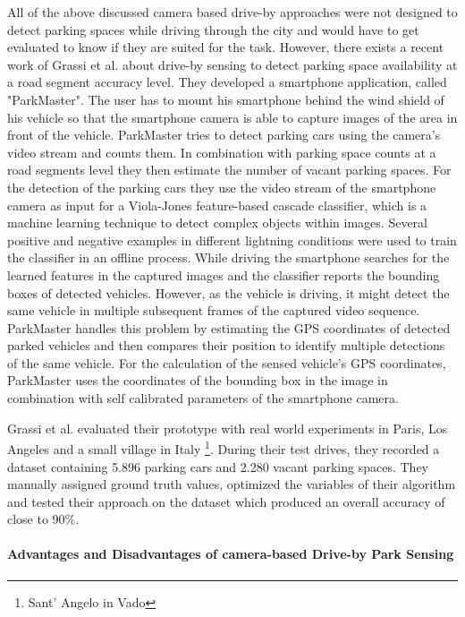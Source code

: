 All of the above discussed camera based drive-by approaches were not designed to detect parking spaces while driving through the city and would have to get evaluated to know if they are suited for the task. However, there exists a recent work of Grassi et al. \cite{Grassi:2017:PIE:3132211.3134452} about drive-by sensing to detect parking space availability at a road segment accuracy level. They developed a smartphone application, called "ParkMaster". The user has to mount his smartphone behind the wind shield of his vehicle so that the smartphone camera is able to capture images of the area in front of the vehicle. ParkMaster tries to detect parking cars using the camera's video stream and counts them. In combination with parking space counts at a road segments level they then estimate the number of vacant parking spaces. For the detection of the parking cars they use the video stream of the smartphone camera as input for a Viola-Jones feature-based cascade classifier, which is a machine learning technique to detect complex objects within images. Several positive and negative examples in different lightning conditions were used to train the classifier in an offline process. While driving the smartphone searches for the learned features in the captured images and the classifier reports the bounding boxes of detected vehicles. However, as the vehicle is driving, it might detect the same vehicle in multiple subsequent frames of the captured video sequence. ParkMaster handles this problem by estimating the GPS coordinates of detected parked vehicles and then compares their position to identify multiple detections of the same vehicle. 
For the calculation of the sensed vehicle's GPS coordinates, ParkMaster uses the coordinates of the bounding box in the image in combination with self calibrated parameters of the smartphone camera.

Grassi et al. evaluated their prototype with real world experiments in Paris, Los Angeles and a small village in Italy \footnote{Sant' Angelo in Vado}. During their test drives, they recorded a dataset containing 5.896 parking cars and 2.280 vacant parking spaces. They manually assigned ground truth values, optimized the variables of their algorithm and tested their approach on the dataset which produced an overall accuracy of close to 90\%. 


\paragraph{Advantages and Disadvantages of camera-based Drive-by Park Sensing}

